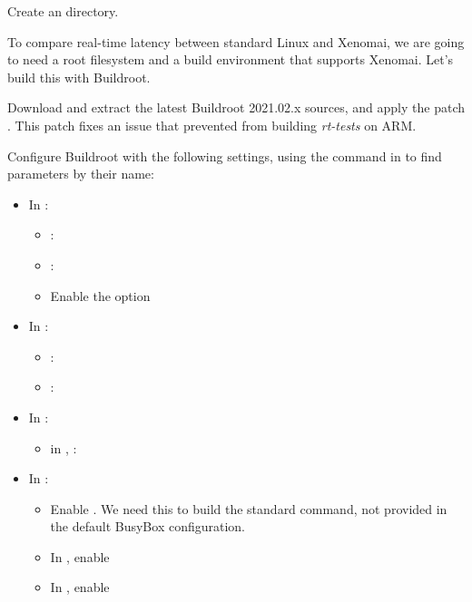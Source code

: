 Create an  directory.

To compare real-time latency between standard Linux and Xenomai, we
are going to need a root filesystem and a build environment that
supports Xenomai. Let's build this with Buildroot.

Download and extract the latest Buildroot 2021.02.x sources, and apply
the patch
. This
patch fixes an issue that prevented from building {\em rt-tests} on ARM.

Configure Buildroot with the following settings,
using the \code{/} command in  to find parameters by their name:

\begin{itemize}
\item In :
   \begin{itemize}
   \item {}: 
   \item {}: 
   \item Enable the  option
   \end{itemize}
\item In :
   \begin{itemize}
   \item {}: 
   \item {}: 
   \end{itemize}
\item In :
   \begin{itemize}
   \item in ,  : 
   \end{itemize}
\item In :
   \begin{itemize}
   \item Enable .
         We need this to build the standard  command, not
         provided in the default BusyBox configuration.
   \item In , enable 
   \item In , enable 
   \end{itemize}
\end{itemize}

